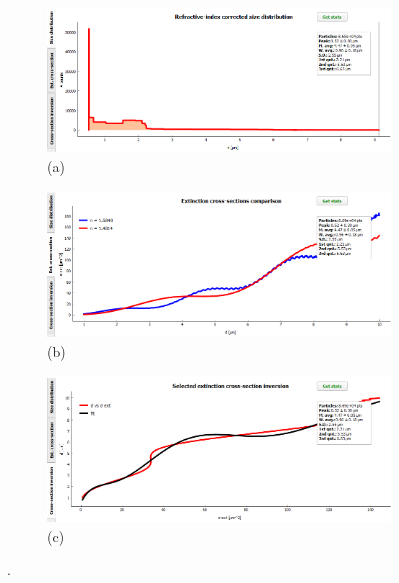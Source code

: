 \documentclass[a4paper, 11pt]{report}
\begin{document}
\begin{figure}[!htb]
	\captionsetup[subfigure]{labelformat=empty}
	\begin{subfigure}{1.\textwidth}
	\centering
	\includegraphics[scale=0.55]{plot_correction_2.png} 
	\caption{(a)}
	\end{subfigure} 
	\begin{subfigure}{1.\textwidth}
	\centering	
	\includegraphics[scale=0.55]{plot_correction_3.png} 
	\caption{(b)}
	\end{subfigure} 
	\par\bigskip
	\begin{subfigure}{1.\textwidth}
	\centering
	\includegraphics[scale=0.55]{plot_correction_4.png} 
	\caption{(c)}
	\end{subfigure} 
	\caption{.}
\end{figure}


\end{document}
